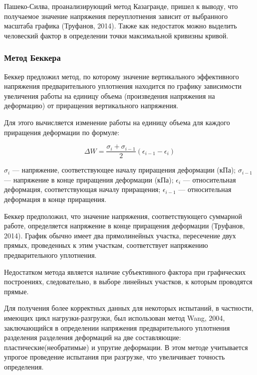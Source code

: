 Пашеко-Силва, проанализирующий метод Казагранде, пришел к выводу, 
что получаемое значение напряжения переуплотнения зависит от выбранного
масштаба графика (Труфанов, 2014). Также как недостаток можно выделить человеский 
фактор в определении точки максимальной кривизны кривой.


\subsubsection{Метод Беккера}

Беккер предложил метод, по которому значение вертикального эффективного 
напряжения предварительного уплотнения находится по 
графику зависимости увеличения работы на единицу объема 
(произведения напряжения на деформацию) от приращения вертикального напряжения.

Для этого вычисляется изменение работы на единицу объема для каждого
приращения деформации по формуле:

\[
   \Delta W = \frac{\sigma_i + \sigma_{i - 1}}{2} (\epsilon_{i - 1} - \epsilon_i)
\]

$\sigma_i$ --- напряжение, соответствующее началу приращения деформации (кПа); 
$\sigma_{i-1}$ --- напряжение в конце приращения деформации (кПа);
$\epsilon_i$ --- относительная деформация, соответствующая началу приращения; 
$\epsilon_{i-1}$ --- относительная деформация в конце
приращения.

Беккер предположил, что значение напряжения, соответствующего суммарной 
работе, определяется напряжение в конце приращения деформации (Труфанов, 2014).
График обычно имеет два прямолинейных участка, пересечение 
двух прямых, проведенных к этим участкам, соответствует 
напряжению предварительного уплотнения. 

Недостатком метода является наличие субъективного фактора при
графических построениях, следовательно, в выборе линейных участков, 
к которым проводятся прямые.

Для получения более корректных данных для некоторых испытаний, 
в частности, имеющих цикл нагрузки-разгрузки, был использован 
метод Wang, 2004, заключающийся в определении напряжения 
предварительного уплотнения разделения разделения деформаций на две 
составляющие: пластические(необратимые) и упругие деформации.
В этом методе учитывается упрогое проведение испытания при разгрузке, 
что увеличивает точность определения.

